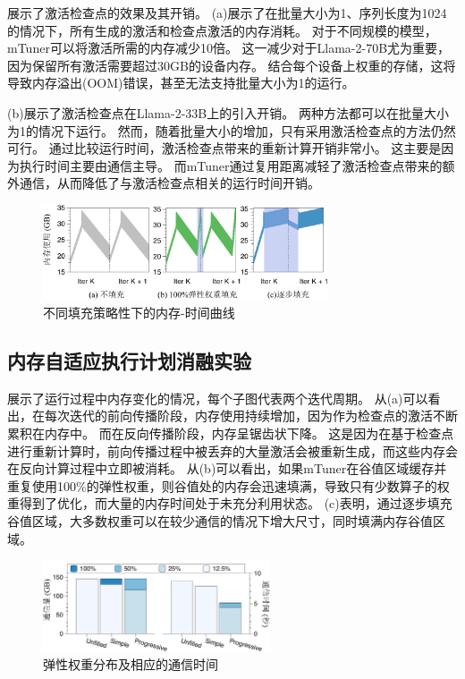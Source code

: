 展示了激活检查点的效果及其开销。  
(a)展示了在批量大小为1、序列长度为1024的情况下，所有生成的激活和检查点激活的内存消耗。  
对于不同规模的模型，mTuner可以将激活所需的内存减少10倍。  
这一减少对于Llama-2-70B尤为重要，因为保留所有激活需要超过30GB的设备内存。  
结合每个设备上权重的存储，这将导致内存溢出(OOM)错误，甚至无法支持批量大小为1的运行。

(b)展示了激活检查点在Llama-2-33B上的引入开销。  
两种方法都可以在批量大小为1的情况下运行。  
然而，随着批量大小的增加，只有采用激活检查点的方法仍然可行。  
通过比较运行时间，激活检查点带来的重新计算开销非常小。  
这主要是因为执行时间主要由通信主导。  
而mTuner通过复用距离减轻了激活检查点带来的额外通信，从而降低了与激活检查点相关的运行时间开销。



\begin{figure}[ht]
\centerline{\includegraphics[width=0.75\textwidth]{figures/mtuner/exp-img/valley-reuse-crop.pdf}}
\caption{不同填充策略性下的内存-时间曲线}
\label{fig:eval-valley-reuse}
\end{figure}

\subsection{内存自适应执行计划消融实验}

展示了运行过程中内存变化的情况，每个子图代表两个迭代周期。  
从(a)可以看出，在每次迭代的前向传播阶段，内存使用持续增加，因为作为检查点的激活不断累积在内存中。  
而在反向传播阶段，内存呈锯齿状下降。  
这是因为在基于检查点进行重新计算时，前向传播过程中被丢弃的大量激活会被重新生成，而这些内存会在反向计算过程中立即被消耗。
从(b)可以看出，如果mTuner在谷值区域缓存并重复使用100\%的弹性权重，则谷值处的内存会迅速填满，导致只有少数算子的权重得到了优化，而大量的内存时间处于未充分利用状态。  
(c)表明，通过逐步填充谷值区域，大多数权重可以在较少通信的情况下增大尺寸，同时填满内存谷值区域。

\begin{figure}[ht]
\centerline{\includegraphics[width=0.6\textwidth]{figures/mtuner/exp-img/valley-effect-crop.pdf}}
\caption{弹性权重分布及相应的通信时间}
\label{fig:eval-valley-effect}
\end{figure}

